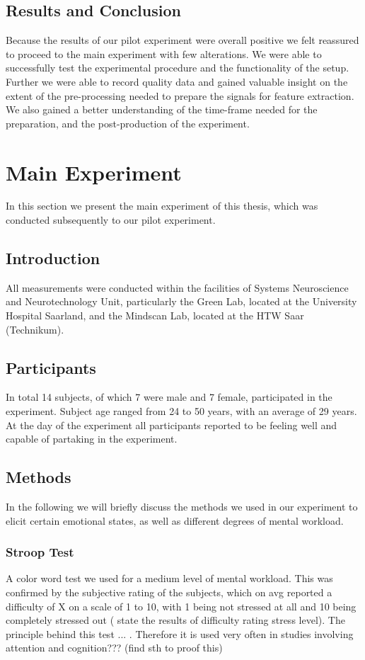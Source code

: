 \subsection{Results and Conclusion}
Because the results of our pilot experiment were overall positive we felt reassured to proceed to the main experiment with few alterations. We were able to successfully test the experimental procedure and the functionality of the setup. Further we were able to record quality data and gained valuable insight on the extent of the pre-processing needed to prepare the signals for feature extraction. We also gained a better understanding of the time-frame needed for the preparation, and the post-production of the experiment.

\section{Main Experiment}
In this section we present the main experiment of this thesis, which was conducted subsequently to our pilot experiment.
\subsection{Introduction}
 


All measurements were conducted within the facilities of Systems Neuroscience and Neurotechnology Unit, particularly the Green Lab, located at the University Hospital Saarland, and the Mindscan Lab, located at the HTW Saar (Technikum).
  
\subsection{Participants}
In total 14 subjects, of which 7 were male and 7 female, participated in the experiment. Subject age ranged from 24 to 50 years, with an average of 29 years. At the day of the experiment all participants reported to be feeling well and capable of partaking in the experiment. 
\subsection{Methods}
In the following we will briefly discuss the methods we used in our experiment to elicit certain emotional states, as well as different degrees of mental workload.
\subsubsection{Stroop Test}
A color word test we used for a medium level of mental workload. This was confirmed by the subjective rating of the subjects, which on avg reported a difficulty of X on a scale of 1 to 10, with 1 being not stressed at all and 10 being completely stressed out (  state the results of difficulty rating stress level). The principle behind this test ... . Therefore it is used very often in studies involving attention and cognition??? (find sth to proof this)

